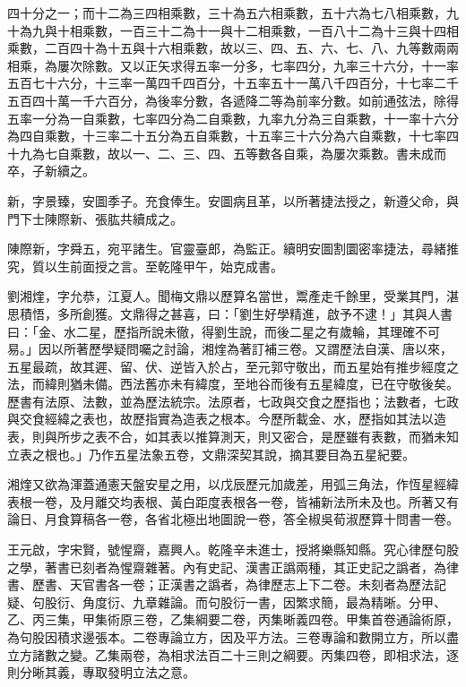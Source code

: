 \begin{pinyinscope}
四十分之一；而十二為三四相乘數，三十為五六相乘數，五十六為七八相乘數，九十為九與十相乘數，一百三十二為十一與十二相乘數，一百八十二為十三與十四相乘數，二百四十為十五與十六相乘數，故以三、四、五、六、七、八、九等數兩兩相乘，為屢次除數。又以正矢求得五率一分多，七率四分，九率三十六分，十一率五百七十六分，十三率一萬四千四百分，十五率五十一萬八千四百分，十七率二千五百四十萬一千六百分，為後率分數，各遞降二等為前率分數。如前通弦法，除得五率一分為一自乘數，七率四分為二自乘數，九率九分為三自乘數，十一率十六分為四自乘數，十三率二十五分為五自乘數，十五率三十六分為六自乘數，十七率四十九為七自乘數，故以一、二、三、四、五等數各自乘，為屢次乘數。書未成而卒，子新續之。

新，字景臻，安圖季子。充食俸生。安圖病且革，以所著捷法授之，新遵父命，與門下士陳際新、張肱共續成之。

陳際新，字舜五，宛平諸生。官靈臺郎，為監正。續明安圖割圜密率捷法，尋緒推究，質以生前面授之言。至乾隆甲午，始克成書。

劉湘煃，字允恭，江夏人。聞梅文鼎以歷算名當世，鬻產走千餘里，受業其門，湛思積悟，多所創獲。文鼎得之甚喜，曰：「劉生好學精進，啟予不逮！」其與人書曰：「金、水二星，歷指所說未徹，得劉生說，而後二星之有歲輪，其理確不可易。」因以所著歷學疑問囑之討論，湘煃為著訂補三卷。又謂歷法自漢、唐以來，五星最疏，故其遲、留、伏、逆皆入於占，至元郭守敬出，而五星始有推步經度之法，而緯則猶未備。西法舊亦未有緯度，至地谷而後有五星緯度，已在守敬後矣。歷書有法原、法數，並為歷法統宗。法原者，七政與交食之歷指也；法數者，七政與交食經緯之表也，故歷指實為造表之根本。今歷所載金、水，歷指如其法以造表，則與所步之表不合，如其表以推算測天，則又密合，是歷雖有表數，而猶未知立表之根也。」乃作五星法象五卷，文鼎深契其說，摘其要目為五星紀要。

湘煃又欲為渾蓋通憲天盤安星之用，以戊辰歷元加歲差，用弧三角法，作恆星經緯表根一卷，及月離交均表根、黃白距度表根各一卷，皆補新法所未及也。所著又有論日、月食算稿各一卷，各省北極出地圖說一卷，答全椒吳荀淑歷算十問書一卷。

王元啟，字宋賢，號惺齋，嘉興人。乾隆辛未進士，授將樂縣知縣。究心律歷句股之學，著書已刻者為惺齋雜著。內有史記、漢書正譌兩種，其正史記之譌者，為律書、歷書、天官書各一卷；正漢書之譌者，為律歷志上下二卷。未刻者為歷法記疑、句股衍、角度衍、九章雜論。而句股衍一書，因繁求簡，最為精晰。分甲、乙、丙三集，甲集術原三卷，乙集綱要二卷，丙集晰義四卷。甲集首卷通論術原，為句股因積求邊張本。二卷專論立方，因及平方法。三卷專論和數開立方，所以盡立方諸數之變。乙集兩卷，為相求法百二十三則之綱要。丙集四卷，即相求法，逐則分晰其義，專取發明立法之意。


\end{pinyinscope}
